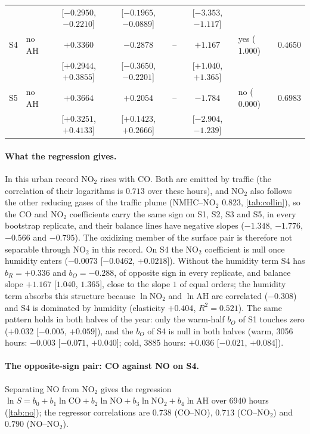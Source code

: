 \documentclass[11pt]{article}
\theoremstyle{definition}\newtheorem{definition}[theorem]{Definition}
\theoremstyle{remark}\newtheorem{remark}[theorem]{Remark}
\begin{document}
\begin{table}[htbp]
\begin{tabular}{@{}llccccll@{}}
 & & [$-0.2950$, $-0.2210$] & [$-0.1965$, $-0.0889$] & & [$-3.353$, $-1.117$] & & \\
S4 & no AH & $+0.3360$ & $-0.2878$ & -- & $\mathbf{+1.167}$ & yes ($1.000$) & $0.4650$\\
 & & [$+0.2944$, $+0.3855$] & [$-0.3650$, $-0.2201$] & & [$+1.040$, $+1.365$] & & \\
S5 & no AH & $+0.3664$ & $+0.2054$ & -- & $-1.784$ & no ($0.000$) & $0.6983$\\
 & & [$+0.3251$, $+0.4133$] & [$+0.1423$, $+0.2666$] & & [$-2.904$, $-1.239$] & & \\\bottomrule
\end{tabular}
\end{table}

\paragraph{What the regression gives.} In this urban record NO$_2$ rises with CO. Both are emitted by traffic (the correlation of their logarithms is $0.713$ over these hours), and NO$_2$ also follows the other reducing gases of the traffic plume (NMHC--NO$_2$ $0.823$, \cref{tab:collin}), so the CO and NO$_2$ coefficients carry the same sign on S1, S2, S3 and S5, in every bootstrap replicate, and their balance lines have negative slopes ($-1.348$, $-1.776$, $-0.566$ and $-0.795$). The oxidizing member of the surface pair is therefore not separable through NO$_2$ in this record. On S4 the NO$_2$ coefficient is null once humidity enters ($-0.0073$ [$-0.0462$, $+0.0218$]). Without the humidity term S4 has $b_R=+0.336$ and $b_O=-0.288$, of opposite sign in every replicate, and balance slope $+1.167$ [$1.040$, $1.365$], close to the slope $1$ of equal orders; the humidity term absorbs this structure because $\ln$NO$_2$ and $\ln$AH are correlated ($-0.308$) and S4 is dominated by humidity (elasticity $+0.404$, $R^2=0.521$). The same pattern holds in both halves of the year: only the warm-half $b_O$ of S1 touches zero ($+0.032$ [$-0.005$, $+0.059$]), and the $b_O$ of S4 is null in both halves (warm, 3056 hours: $-0.003$ [$-0.071$, $+0.040$]; cold, 3885 hours: $+0.036$ [$-0.021$, $+0.084$]).

\paragraph{The opposite-sign pair: CO against NO on S4.} Separating NO from NO$_2$ gives the regression $\ln S=b_0+b_1\ln\mathrm{CO}+b_2\ln\mathrm{NO}+b_3\ln\mathrm{NO_2}+b_4\ln\mathrm{AH}$ over 6940 hours (\cref{tab:no}); the regressor correlations are $0.738$ (CO--NO), $0.713$ (CO--NO$_2$) and $0.790$ (NO--NO$_2$).
\end{document}

